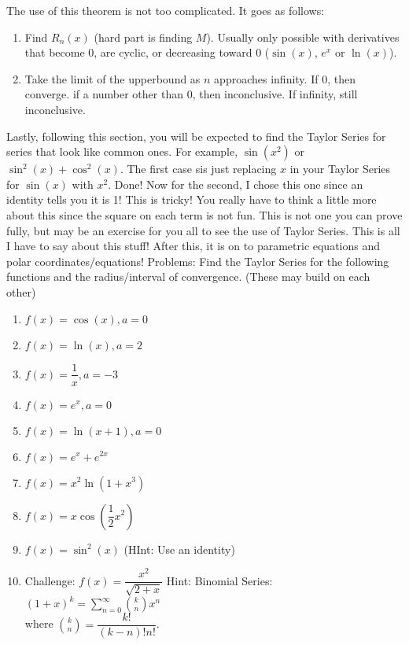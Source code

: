 \documentclass[10pt]{article}
\newcommand{\ds}{\displaystyle}
\theoremstyle{Theorem}
\theoremstyle{definition}
\theoremstyle{remark}
\theoremstyle{custom}
\begin{document}
The use of this theorem is not too complicated. It goes as follows:
\begin{enumerate}[1.]
\item Find $R_n(x)$ (hard part is finding $M$). Usually only possible with derivatives that become 0, are cyclic, or decreasing toward 0 ($\sin(x)$, $e^x$ or $\ln(x)$).
\item Take the limit of the upperbound as $n$ approaches infinity. If 0, then converge. if a number other than 0, then inconclusive. If infinity, still inconclusive.
\end{enumerate}
Lastly, following this section, you will be expected to find the Taylor Series for series that look like common ones. For example, $\sin(x^2)$ or $\sin^2(x)+\cos^2(x)$. The first case sis just replacing $x$ in your Taylor Series for $\sin(x)$ with $x^2$. Done! Now for the second, I chose this one since an identity tells you it is 1! This is tricky! You really have to think a little more about this since the square on each term is not fun. This is not one you can prove fully, but may be an exercise for you all to see the use of Taylor Series. This is all I have to say about this stuff! After this, it is on to parametric equations and polar coordinates/equations!
\newpage
\noindent Problems: Find the Taylor Series for the following functions and the radius/interval of convergence. (These may build on each other)
\begin{enumerate}[1.]
\item $f(x)=\cos(x), a=0$
\item $f(x)=\ln(x), a=2$
\item $f(x)=\dfrac{1}{x}, a=-3$
\item $f(x)=e^x, a=0$
\item $f(x)=\ln(x+1), a=0$
\item $f(x)=e^x+e^{2x}$
\item $f(x)=x^2\ln(1+x^3)$
\item $f(x)=x\cos\left(\dfrac{1}{2}x^2\right)$
\item $f(x)=\sin^2(x)$ (HInt: Use an identity)
\item Challenge: $f(x)=\dfrac{x^2}{\sqrt{2+x}}$ Hint: Binomial Series: $(1+x)^k=\ds \sum_{n=0}^{\infty} \binom{k}{n}x^n$\\ where $\ds \binom{k}{n}=\dfrac{k!}{(k-n)!n!}$.
\end{enumerate}
\end{document}
